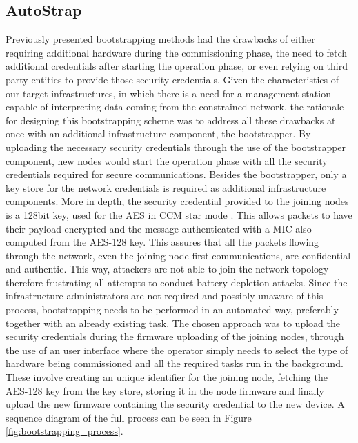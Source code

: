 \documentclass{sig-alternate-05-2015}
\begin{document}
\subsection{AutoStrap}
\label{sec:implementation_details}
Previously presented bootstrapping methods had the drawbacks of either requiring additional hardware during the commissioning phase, the need to fetch additional credentials after starting the operation phase, or even relying on third party entities to provide those security credentials. Given the characteristics of our target infrastructures, in which there is a need for a management station capable of interpreting data coming from the constrained network, the rationale for designing this bootstrapping scheme was to address all these drawbacks at once with an additional infrastructure component, the bootstrapper. By uploading the necessary security credentials through the use of the bootstrapper component, new nodes would start the operation phase with all the security credentials required for secure communications. Besides the bootstrapper, only a key store for the network credentials is required as additional infrastructure components. More in depth, the security credential provided to the joining nodes is a 128bit key, used for the \gls{AES} \cite{Fips2001} in \gls{CCM} star mode \cite{Corp2005}. This allows packets to have their payload encrypted and the message authenticated with a \gls{MIC} also computed from the AES-128 key. This assures that all the packets flowing through the network, even the joining node first communications, are confidential and authentic. This way, attackers are not able to join the network topology therefore frustrating all attempts to conduct battery depletion attacks. Since the infrastructure administrators are not required and possibly unaware of this process, bootstrapping needs to be performed in an automated way, preferably together with an already existing task. The chosen approach was to upload the security credentials during the firmware uploading of the joining nodes, through the use of an user interface where the operator simply needs to select the type of hardware being commissioned and all the required tasks run in the background. These involve creating an unique identifier for the joining node, fetching the AES-128 key from the key store, storing it in the node firmware and finally upload the new firmware containing the security credential to the new device. A sequence diagram of the full process can be seen in Figure \ref{fig:bootstrapping_process}.
\end{document}
